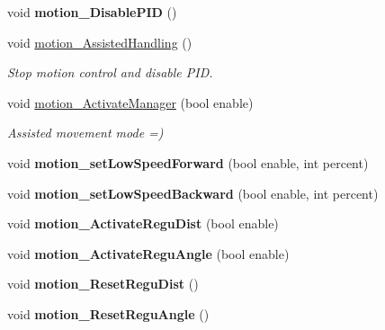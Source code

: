 \begin{DoxyCompactItemize}
void {\bfseries motion\+\_\+\+Disable\+P\+ID} ()
\item 
\mbox{\label{classAsservDriver_a733d0cddfdb612cea9e8097b348537f1}} 
void \hyperlink{classAsservDriver_a733d0cddfdb612cea9e8097b348537f1}{motion\+\_\+\+Assisted\+Handling} ()
\begin{DoxyCompactList}\small\item\em Stop motion control and disable P\+ID. \end{DoxyCompactList}\item 
\mbox{\label{classAsservDriver_aaeb3c80c8a079c812af38273f825c537}} 
void \hyperlink{classAsservDriver_aaeb3c80c8a079c812af38273f825c537}{motion\+\_\+\+Activate\+Manager} (bool enable)
\begin{DoxyCompactList}\small\item\em Assisted movement mode =) \end{DoxyCompactList}\item 
\mbox{\label{classAsservDriver_a17a6651fc8ecebafc085c46af984b099}} 
void {\bfseries motion\+\_\+set\+Low\+Speed\+Forward} (bool enable, int percent)
\item 
\mbox{\label{classAsservDriver_ac01272d7ef32443b3c283186041324c3}} 
void {\bfseries motion\+\_\+set\+Low\+Speed\+Backward} (bool enable, int percent)
\item 
\mbox{\label{classAsservDriver_a48e4f69bf857d6a18098dc48615a61f1}} 
void {\bfseries motion\+\_\+\+Activate\+Regu\+Dist} (bool enable)
\item 
\mbox{\label{classAsservDriver_a846608b8033f7d592d2540b68de72eeb}} 
void {\bfseries motion\+\_\+\+Activate\+Regu\+Angle} (bool enable)
\item 
\mbox{\label{classAsservDriver_acb84d282c7e0b40d9b326b0fcb7a0c69}} 
void {\bfseries motion\+\_\+\+Reset\+Regu\+Dist} ()
\item 
\mbox{\label{classAsservDriver_acd102376cacdf0fc40a587f25359a25e}} 
void {\bfseries motion\+\_\+\+Reset\+Regu\+Angle} ()
\item 
\mbox{\label{classAsservDriver_a9d967bff5061c791226484bbd998362b}} 

\end{DoxyCompactItemize}
